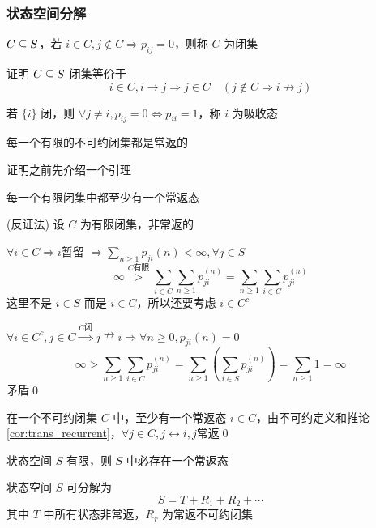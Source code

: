 \subsubsection{状态空间分解}
\begin{definition}[闭集]
    $C\subseteq S$，若 $i\in C,j\notin C\Rightarrow p_{ij}=0$，则称 $C$ 为闭集
\end{definition}

\begin{problem}[作业6-3]
    证明 $C\subseteq S$ 闭集等价于
    \[
    i\in C,i\to j\Rightarrow j\in C\quad (j\notin C\Rightarrow i\nrightarrow j)
    \]
\end{problem}

\begin{example}
    若 $\{i\}$ 闭，则 $\forall j\neq i,p_{ij}=0\Leftrightarrow p_{ii}=1$，称 $i$ 为吸收态
\end{example}

\begin{theorem}
    每一个有限的不可约闭集都是常返的
\end{theorem}

证明之前先介绍一个引理

\begin{lemma}
    每一个有限闭集中都至少有一个常返态
\end{lemma}

(反证法) 设 $C$ 为有限闭集，非常返的

$\forall i\in C\Rightarrow i$暂留 $\Rightarrow \sum_{n\geq 1}p_{ji}(n)<\infty,\forall j\in S$
\[
\infty\overset{C\text{有限}}{>}\sum_{i\in C}\sum_{n\geq 1}p_{ji}^{(n)}=\sum_{n\geq 1}\sum_{i\in C}p_{ji}^{(n)}
\]
这里不是 $i\in S$ 而是 $i\in C$，所以还要考虑 $i\in C^c$

$\forall i\in C^c,j\in C\overset{C\text{闭}}{\Rightarrow}j\nrightarrow i \Rightarrow \forall n\geq 0,p_{ji}(n)=0$
\[
\infty>\sum_{n\geq 1}\sum_{i\in C}p_{ji}^{(n)}=\sum_{n\geq 1}\left(\sum_{i\in S}p_{ji}^{(n)}\right)=\sum_{n\geq 1}1=\infty
\]
矛盾\qed

在一个不可约闭集 $C$ 中，至少有一个常返态 $i\in C$，由不可约定义和推论\ref{cor:trans_recurrent}，$\forall j\in C,j\leftrightarrow i,j$常返\qed

\begin{corollary}
    状态空间 $S$ 有限，则 $S$ 中必存在一个常返态
\end{corollary}

\begin{theorem}[分解定理]
    状态空间 $S$ 可分解为
    \[
    S=T+R_1+R_2+\cdots
    \]
    其中 $T$ 中所有状态非常返，$R_r$ 为常返不可约闭集
\end{theorem}

